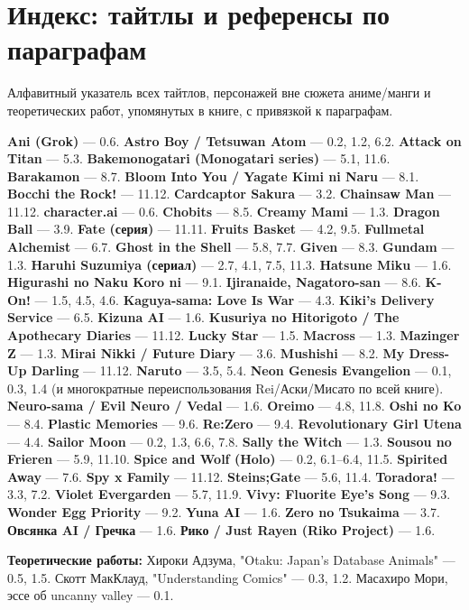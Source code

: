 \section{Индекс: тайтлы и референсы по параграфам}

Алфавитный указатель всех тайтлов, персонажей вне сюжета аниме/манги и теоретических работ, упомянутых в книге, с привязкой к параграфам.

\textbf{Ani (Grok)} — 0.6. \textbf{Astro Boy / Tetsuwan Atom} — 0.2, 1.2, 6.2. \textbf{Attack on Titan} — 5.3. \textbf{Bakemonogatari (Monogatari series)} — 5.1, 11.6. \textbf{Barakamon} — 8.7. \textbf{Bloom Into You / Yagate Kimi ni Naru} — 8.1. \textbf{Bocchi the Rock!} — 11.12. \textbf{Cardcaptor Sakura} — 3.2. \textbf{Chainsaw Man} — 11.12. \textbf{character.ai} — 0.6. \textbf{Chobits} — 8.5. \textbf{Creamy Mami} — 1.3. \textbf{Dragon Ball} — 3.9. \textbf{Fate (серия)} — 11.11. \textbf{Fruits Basket} — 4.2, 9.5. \textbf{Fullmetal Alchemist} — 6.7. \textbf{Ghost in the Shell} — 5.8, 7.7. \textbf{Given} — 8.3. \textbf{Gundam} — 1.3. \textbf{Haruhi Suzumiya (сериал)} — 2.7, 4.1, 7.5, 11.3. \textbf{Hatsune Miku} — 1.6. \textbf{Higurashi no Naku Koro ni} — 9.1. \textbf{Ijiranaide, Nagatoro-san} — 8.6. \textbf{K-On!} — 1.5, 4.5, 4.6. \textbf{Kaguya-sama: Love Is War} — 4.3. \textbf{Kiki's Delivery Service} — 6.5. \textbf{Kizuna AI} — 1.6. \textbf{Kusuriya no Hitorigoto / The Apothecary Diaries} — 11.12. \textbf{Lucky Star} — 1.5. \textbf{Macross} — 1.3. \textbf{Mazinger Z} — 1.3. \textbf{Mirai Nikki / Future Diary} — 3.6. \textbf{Mushishi} — 8.2. \textbf{My Dress-Up Darling} — 11.12. \textbf{Naruto} — 3.5, 5.4. \textbf{Neon Genesis Evangelion} — 0.1, 0.3, 1.4 (и многократные переиспользования Rei/Аски/Мисато по всей книге). \textbf{Neuro-sama / Evil Neuro / Vedal} — 1.6. \textbf{Oreimo} — 4.8, 11.8. \textbf{Oshi no Ko} — 8.4. \textbf{Plastic Memories} — 9.6. \textbf{Re:Zero} — 9.4. \textbf{Revolutionary Girl Utena} — 4.4. \textbf{Sailor Moon} — 0.2, 1.3, 6.6, 7.8. \textbf{Sally the Witch} — 1.3. \textbf{Sousou no Frieren} — 5.9, 11.10. \textbf{Spice and Wolf (Holo)} — 0.2, 6.1--6.4, 11.5. \textbf{Spirited Away} — 7.6. \textbf{Spy x Family} — 11.12. \textbf{Steins;Gate} — 5.6, 11.4. \textbf{Toradora!} — 3.3, 7.2. \textbf{Violet Evergarden} — 5.7, 11.9. \textbf{Vivy: Fluorite Eye's Song} — 9.3. \textbf{Wonder Egg Priority} — 9.2. \textbf{Yuna AI} — 1.6. \textbf{Zero no Tsukaima} — 3.7. \textbf{Овсянка AI / Гречка} — 1.6. \textbf{Рико / Just Rayen (Riko Project)} — 1.6.

\textbf{Теоретические работы:} Хироки Адзума, "Otaku: Japan's Database Animals" — 0.5, 1.5. Скотт МакКлауд, "Understanding Comics" — 0.3, 1.2. Масахиро Мори, эссе об uncanny valley — 0.1.
